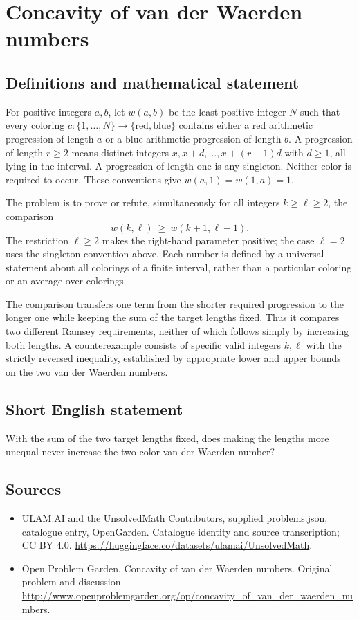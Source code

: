 \documentclass[11pt,a4paper]{article}
\begin{document}
\section*{Concavity of van der Waerden numbers}\label{statement}

\subsection{Definitions and mathematical statement}
For positive integers $a,b$, let $w(a,b)$ be the least positive integer $N$ such that every coloring $c:\{1,\ldots,N\}\to\{\mathrm{red},\mathrm{blue}\}$ contains either a red arithmetic progression of length $a$ or a blue arithmetic progression of length $b$. A progression of length $r\ge2$ means distinct integers $x,x+d,\ldots,x+(r-1)d$ with $d\ge1$, all lying in the interval. A progression of length one is any singleton. Neither color is required to occur. These conventions give $w(a,1)=w(1,a)=1$.

The problem is to prove or refute, simultaneously for all integers $k\ge\ell\ge2$, the comparison
\[
                   w(k,\ell)\ \ge\ w(k+1,\ell-1).
\]
The restriction $\ell\ge2$ makes the right-hand parameter positive; the case $\ell=2$ uses the singleton convention above. Each number is defined by a universal statement about all colorings of a finite interval, rather than a particular coloring or an average over colorings.

The comparison transfers one term from the shorter required progression to the longer one while keeping the sum of the target lengths fixed. Thus it compares two different Ramsey requirements, neither of which follows simply by increasing both lengths. A counterexample consists of specific valid integers $k,\ell$ with the strictly reversed inequality, established by appropriate lower and upper bounds on the two van der Waerden numbers.
\subsection{Short English statement}
With the sum of the two target lengths fixed, does making the lengths more unequal never increase the two-color van der Waerden number?
\subsection{Sources}
\begin{itemize}
\item[S1] ULAM.AI and the UnsolvedMath Contributors, supplied problems.json, catalogue entry, OpenGarden. Catalogue identity and source transcription; CC BY 4.0.
\url{https://huggingface.co/datasets/ulamai/UnsolvedMath}.
\item[S2] Open Problem Garden, Concavity of van der Waerden numbers. Original problem and discussion.
\url{http://www.openproblemgarden.org/op/concavity_of_van_der_waerden_numbers}.
\end{itemize}
\end{document}
